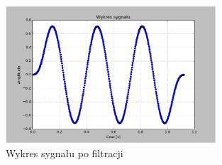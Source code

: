 \documentclass{article}
\begin{document}
{{            \begin{figure}[h!]
                \centering
                \includegraphics[width=0.7\textwidth]{img/fil16.png}
                \caption{Wykres sygnału po filtracji}
            \end{figure}
            \FloatBarrier
        }
        \newpage

}
\end{document}

